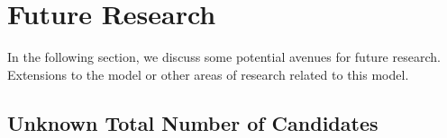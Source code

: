 \documentclass{article}
\begin{document}


\section{Future Research}

In the following section, we discuss some potential avenues for future research. Extensions to the model or other areas of research related to this model.

\subsection{Unknown Total Number of Candidates}
\end{document}
